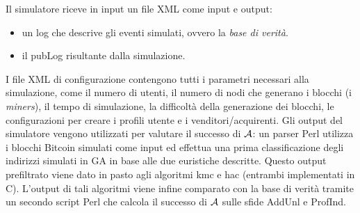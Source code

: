 Il simulatore riceve in input un file XML come input e output:

\begin{itemize}
    \item un log che descrive gli eventi simulati, ovvero la \emph{base di verità}.
    \item il pubLog risultante dalla simulazione.
\end{itemize}
I file XML di configurazione contengono tutti i parametri necessari alla simulazione, come il numero di utenti, il numero di nodi che generano i blocchi (i \emph{miners}), il tempo di simulazione, la difficoltà della generazione dei blocchi, le configurazioni per creare i profili utente e i venditori/acquirenti.
Gli output del simulatore vengono utilizzati per valutare il successo di $\mathcal{A}$: un parser Perl utilizza i blocchi Bitcoin simulati come input ed effettua una prima classificazione degli indirizzi simulati in GA in base alle due euristiche descritte.
Questo output prefiltrato viene dato in pasto agli algoritmi \gls{kmc} e \gls{hac} (entrambi implementati in C).
L'output di tali algoritmi viene infine comparato con la base di verità tramite un secondo script Perl che calcola il successo di $\mathcal{A}$ sulle sfide AddUnl e ProfInd.

